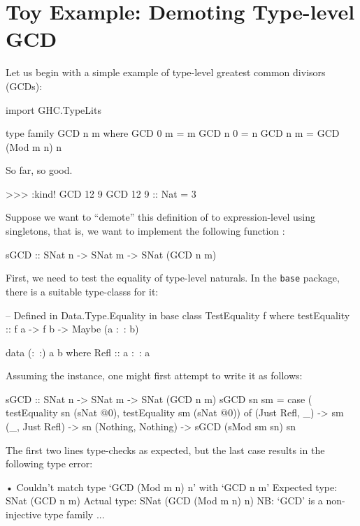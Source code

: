 \documentclass[demotion-paper.tex]{subfiles}
\begin{document}
\section{Toy Example: Demoting Type-level GCD}
\label{sec:gcd}
Let us begin with a simple example of type-level greatest common divisors (GCDs):

\begin{code}
import GHC.TypeLits

type family GCD n m where
  GCD 0 m = m
  GCD n 0 = n
  GCD n m = GCD (Mod m n) n
\end{code}

So far, so good.

\begin{repl}
>>> :kind! GCD 12 9
GCD 12 9 :: Nat
= 3
\end{repl}

Suppose we want to ``demote'' this definition of  to expression-level using singletons, that is, we want to implement the following function :

\begin{code}
sGCD :: SNat n -> SNat m -> SNat (GCD n m)
\end{code}

First, we need to test the equality of type-level naturals.
In the \texttt{base} package, there is a suitable type-classs for it:
\begin{code}
-- Defined in Data.Type.Equality in base
class TestEquality f where
  testEquality :: f a -> f b -> Maybe (a :~: b)

data (:~:) a b where Refl :: a :~: a
\end{code}
Assuming the  instance, one might first attempt to write it as follows:
\begin{code}
sGCD :: SNat n -> SNat m -> SNat (GCD n m)
sGCD sn sm =
  case ( testEquality sn (sNat @0), 
         testEquality sm (sNat @0)) of
    (Just Refl, _) -> sm
    (_, Just Refl) -> sn
    (Nothing, Nothing) -> sGCD (sMod sm sn) sn
\end{code}

The first two lines type-checks as expected, but the last case results in the following type error:

\begin{repl}
• Couldn't match type ‘GCD (Mod m n) n’
  with ‘GCD n m’
  Expected type: SNat (GCD n m)
    Actual type: SNat (GCD (Mod m n) n)
  NB: ‘GCD’ is a non-injective type family
  ...
\end{repl}
\end{document}
